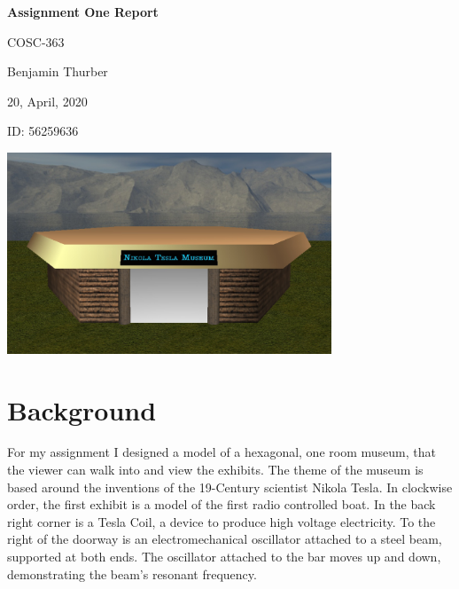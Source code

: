\documentclass[10pt, oneside]{article}   	%
\begin{document}
\begin{center}
\LARGE{\textbf{Assignment One Report}}	%
\end{center}
\vspace{-1mm}
\begin{flushright}
\large{COSC-363}
\end{flushright}
\vspace{-11mm}
\large{Benjamin Thurber}			%
\vspace{0mm}
\begin{center}
\centerline{\large{20, April, 2020}}
\end{center}

\vspace{-10mm}
\begin{flushleft}
ID: 56259636

\end{flushleft}

\begin{center}
\vspace{2mm}
\includegraphics[height=6cm]{building.jpg}   %
\end{center}


\vspace{-3mm}
\normalsize

\section{Background}
For my assignment I designed a model of a hexagonal, one room museum, that the viewer can walk into and view the exhibits.  The theme of the museum is based around the inventions of the 19-Century scientist Nikola Tesla.  In clockwise order, the first exhibit is a model of the first radio controlled boat.  In the back right corner is a Tesla Coil, a device to produce high voltage electricity.  To the right of the doorway is an electromechanical oscillator attached to a steel beam, supported at both ends.  The oscillator attached to the bar moves up and down, demonstrating the beam's resonant frequency.
\end{document}
